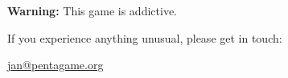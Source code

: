 \hrulefill

\centering

\medskip




\medskip



\vfill

\begin{framed}
\centering

\textbf{Warning: }This game is addictive.

If you experience anything unusual, please get in touch:

\href{mailto:jan@pentagame.org}{jan@pentagame.org}

\end{framed}
